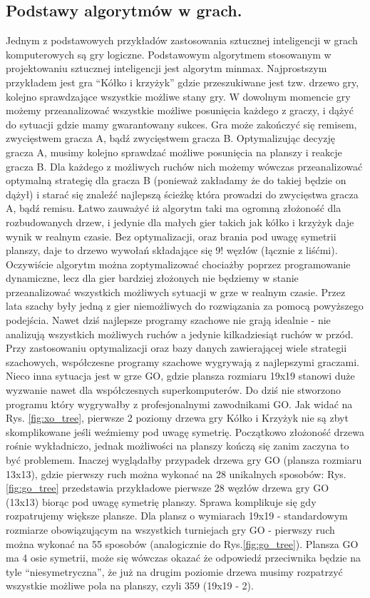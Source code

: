 \subsection{Podstawy algorytmów w grach.}
\begin{par}
Jednym z podstawowych przykładów zastosowania sztucznej inteligencji w grach komputerowych są gry logiczne. 
Podstawowym algorytmem stosowanym w projektowaniu sztucznej inteligencji jest algorytm minmax.
Najprostszym przykładem jest gra ``Kółko i krzyżyk'' gdzie przeszukiwane jest tzw. drzewo gry, kolejno sprawdzające wszystkie możliwe stany gry. 
W dowolnym momencie gry możemy przeanalizować wszystkie możliwe posunięcia każdego z graczy, i dążyć do sytuacji gdzie mamy gwarantowany sukces.
Gra może zakończyć się remisem, zwycięstwem gracza A, bądź zwycięstwem gracza B.
Optymalizując decyzję gracza A, musimy kolejno sprawdzać możliwe posunięcia na planszy i reakcje gracza B. 
Dla każdego z możliwych ruchów nich możemy wówczas przeanalizować optymalną strategię dla gracza B (ponieważ zakładamy że do takiej będzie on dążył) i starać się znaleźć 
najlepszą ścieżkę która prowadzi do zwycięstwa gracza A, bądź remisu.
Łatwo zauważyć iż algorytm taki ma ogromną złożoność dla rozbudowanych drzew, i jedynie dla małych gier takich jak kółko i krzyżyk daje wynik w realnym czasie.
Bez optymalizacji, oraz brania pod uwagę symetrii planszy, daje to drzewo wywołań składające się 9! węzłów (łącznie z liśćmi). 
Oczywiście algorytm można zoptymalizować chociażby poprzez programowanie dynamiczne, lecz dla gier bardziej złożonych nie będziemy w stanie przeanalizować wszystkich możliwych sytuacji w grze w realnym czasie.
Przez lata szachy były jedną z gier niemożliwych do rozwiązania za pomocą powyższego podejścia.
Nawet dziś najlepsze programy szachowe nie grają idealnie - nie analizują wszystkich możliwych ruchów a jedynie kilkadziesiąt ruchów w przód.
Przy zastosowaniu optymalizacji oraz bazy danych zawierającej wiele strategii szachowych, współczesne programy szachowe wygrywają z najlepszymi graczami.
Nieco inna sytuacja jest w grze GO, gdzie plansza rozmiaru 19x19 stanowi duże wyzwanie nawet dla współczesnych superkomputerów. 
Do dziś nie stworzono programu który wygrywałby z profesjonalnymi zawodnikami GO.
Jak widać na Rys. \ref{fig:xo_tree}, pierwsze 2 poziomy drzewa gry Kółko i Krzyżyk nie są zbyt skomplikowane jeśli weźmiemy pod uwagę symetrię.
Początkowo złożoność drzewa rośnie wykładniczo, jednak możliwości na planszy kończą się zanim zaczyna to być problemem.
Inaczej wyglądałby przypadek drzewa gry GO (plansza rozmiaru 13x13), gdzie pierwszy ruch można wykonać na 28 unikalnych sposobów: Rys. \ref{fig:go_tree} przedstawia przykładowe pierwsze 28 węzłów drzewa gry GO (13x13) biorąc pod uwagę symetrię planszy.
Sprawa komplikuje się gdy rozpatrujemy większe plansze.
Dla plansz o wymiarach 19x19 - standardowym rozmiarze obowiązującym na wszystkich turniejach gry GO - pierwszy ruch można wykonać na 55 sposobów (analogicznie do Rys.\ref{fig:go_tree}). Plansza GO ma 4 osie symetrii, może się wówczas okazać że odpowiedź przeciwnika będzie na tyle ``niesymetryczna'', że już na drugim
poziomie drzewa musimy rozpatrzyć wszystkie możliwe pola na planszy, czyli 359 (19x19 - 2).


\end{par}
